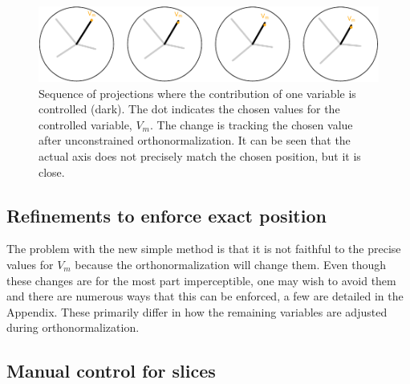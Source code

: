 \documentclass[]{interact}
\theoremstyle{plain}%
\theoremstyle{definition}
\theoremstyle{remark}
\begin{document}
\begin{figure}
\includegraphics[width=1\linewidth]{paper_files/figure-latex/manualsequence-1} \caption{Sequence of projections where the contribution of one variable is controlled (dark). The dot indicates the chosen values for the controlled variable, $V_m$. The change is tracking the chosen value after unconstrained orthonormalization. It can be seen that the actual axis does not precisely match the chosen position, but it is close.}\label{fig:manualsequence}
\end{figure}

\hypertarget{refinements-to-enforce-exact-position}{%
\subsection{Refinements to enforce exact
position}\label{refinements-to-enforce-exact-position}}

The problem with the new simple method is that it is not faithful to the
precise values for \(V_m\) because the orthonormalization will change
them. Even though these changes are for the most part imperceptible, one
may wish to avoid them and there are numerous ways that this can be
enforced, a few are detailed in the Appendix. These primarily differ in
how the remaining variables are adjusted during orthonormalization.

\hypertarget{manual-control-for-slices}{%
\subsection{Manual control for slices}\label{manual-control-for-slices}}
\end{document}
